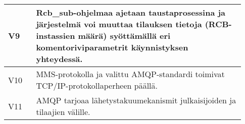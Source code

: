 \begin{table}[ht!]
\begin{tabular}{p{0.11\linewidth} | p{0.82\linewidth}}
		V9 & Rcb\_sub-ohjelmaa ajetaan taustaprosessina ja järjestelmä voi muuttaa tilauksen tietoja (RCB-instassien määrä) syöttämällä eri komentoriviparametrit käynnistyksen yhteydessä. \\
		\hline
		V10 & MMS-protokolla ja valittu AMQP-standardi toimivat TCP/IP-protokollaperheen päällä. \\
		\hline
		V11 & AMQP tarjoaa lähetystakuumekanismit julkaisijoiden ja tilaajien välille. \\
		\hline
	\end{tabular}
\end{table}